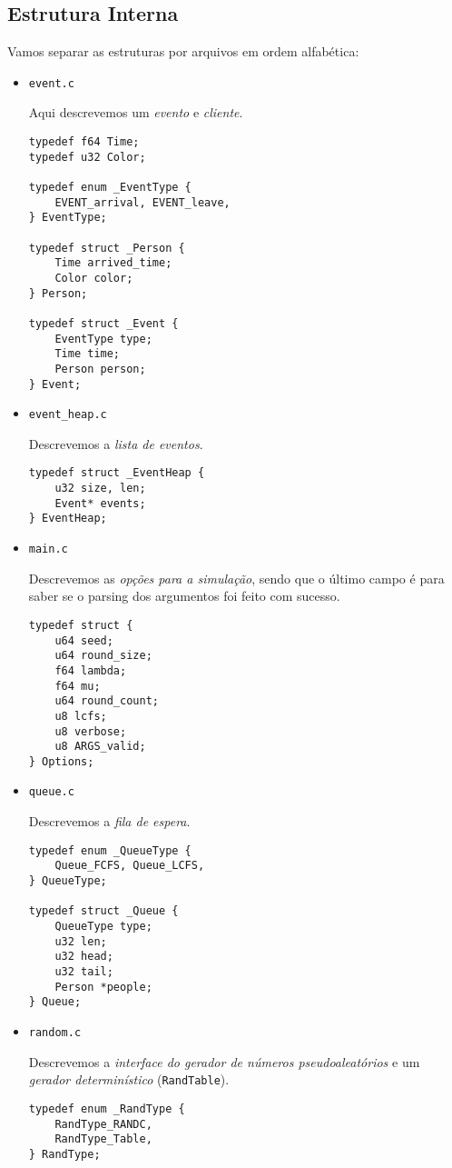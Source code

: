 \documentclass[a4paper]{article}
\newcommand{\arq}{\texttt}
\newcommand{\inlcode}{\texttt}
\begin{document}
\subsection{Estrutura Interna}
Vamos separar as estruturas por arquivos em ordem alfabética:
\begin{itemize}
    \item \arq{event.c} \par
        Aqui descrevemos um \emph{evento} e \emph{cliente}.
        \begin{verbatim}
typedef f64 Time;
typedef u32 Color;

typedef enum _EventType {
    EVENT_arrival, EVENT_leave,
} EventType;

typedef struct _Person {
    Time arrived_time;
    Color color;
} Person;

typedef struct _Event {
    EventType type;
    Time time;
    Person person;
} Event;
        \end{verbatim}
    \item \arq{event\_heap.c} \par
        Descrevemos a \emph{lista de eventos}.
        \begin{verbatim}
typedef struct _EventHeap {
    u32 size, len;
    Event* events;
} EventHeap;
        \end{verbatim}
    \item \arq{main.c} \par
        Descrevemos as \emph{opções para a simulação},
        sendo que o último campo é
        para saber se o parsing dos argumentos foi feito com sucesso.
        \begin{verbatim}
typedef struct {
    u64 seed;
    u64 round_size;
    f64 lambda;
    f64 mu;
    u64 round_count;
    u8 lcfs;
    u8 verbose;
    u8 ARGS_valid;
} Options;
        \end{verbatim}
    \item \arq{queue.c} \par
        Descrevemos a \emph{fila de espera}.
        \begin{verbatim}
typedef enum _QueueType {
    Queue_FCFS, Queue_LCFS,
} QueueType;

typedef struct _Queue {
    QueueType type;
    u32 len;
    u32 head;
    u32 tail;
    Person *people;
} Queue;
        \end{verbatim}
    \item \arq{random.c} \par
        Descrevemos a \emph{interface
        do gerador de números pseudoaleatórios}
        e um \emph{gerador determinístico}
        (\inlcode{RandTable}).
        \begin{verbatim}
typedef enum _RandType {
    RandType_RANDC,
    RandType_Table,
} RandType;


\end{verbatim}
\end{itemize}
\end{document}
